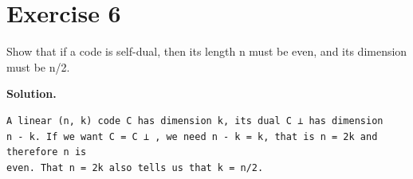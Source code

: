 \documentclass[11pt]{article}
\begin{document}
\section*{Exercise 6}
\begin{exercisebox}
Show that if a code is self-dual, then its length n must be even, and its dimension must be n/2.

\end{exercisebox}
\begin{solutionbox}
\textbf{Solution.}

\begin{Verbatim}[fontsize=\small]
A linear (n, k) code C has dimension k, its dual C ⊥ has dimension
n - k. If we want C = C ⊥ , we need n - k = k, that is n = 2k and therefore n is
even. That n = 2k also tells us that k = n/2.
\end{Verbatim}
\end{solutionbox}
\end{document}
